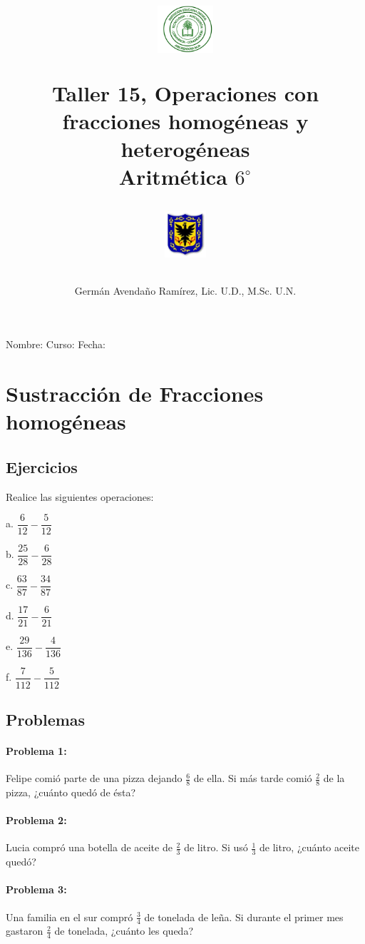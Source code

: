 \documentclass[10pt,twoside]{article}
\author{Germ\'an Avenda\~no Ram\'irez, Lic. U.D., M.Sc. U.N.}
\title{\begin{minipage}{.2\textwidth}
\includegraphics[height=1.75cm]{Images/logo-colegio.png}\end{minipage}
\begin{minipage}{.55\textwidth}
\begin{center}
Taller 15, Operaciones con fracciones homogéneas y heterogéneas \\
Aritmética $6^{\circ}$
\end{center}
\end{minipage}\hfill
\begin{minipage}{.2\textwidth}
\includegraphics[height=1.75cm]{Images/logo-sed.png} 
\end{minipage}}
\date{}
\begin{document}
\maketitle
Nombre: \hrulefill Curso: \underline{\hspace*{44pt}} Fecha: \underline{\hspace*{2.5cm}}
\section*{Sustracción de Fracciones homog\'{e}neas}
\subsection*{Ejercicios}
Realice las siguientes operaciones:
\begin{enumerate}
\begin{multicols}{3}
\item[a.] $\dfrac{6}{12}-\dfrac{5}{12}$
\item[b.] $\dfrac{25}{28}-\dfrac{6}{28}$
\item[c.] $\dfrac{63}{87}-\dfrac{34}{87}$
\item[d.] $\dfrac{17}{21}-\dfrac{6}{21}$
\item[e.] $\dfrac{29}{136}-\dfrac{4}{136}$
\item[f.] $\dfrac{7}{112}-\dfrac{5}{112}$
\end{multicols}
\end{enumerate}
\subsection*{Problemas}
\paragraph*{Problema 1:} Felipe comi\'{o} parte de una pizza dejando $\frac{6}{8}$ de ella. Si m\'{a}s tarde comi\'{o} $\frac{2}{8}$ de la pizza, ¿cu\'{a}nto qued\'{o} de \'{e}sta?
\paragraph*{Problema 2:}
Lucia compró una botella de aceite de $\frac{2}{3}$ de litro. Si usó $\frac{1}{3}$ de litro, ¿cuánto aceite quedó?
\paragraph*{Problema 3:} Una familia en el sur compr\'{o} $\frac{3}{4}$ de tonelada de leña. Si durante el primer mes gastaron $\frac{2}{4}$ de tonelada, ¿cuánto les queda?
\end{document}
